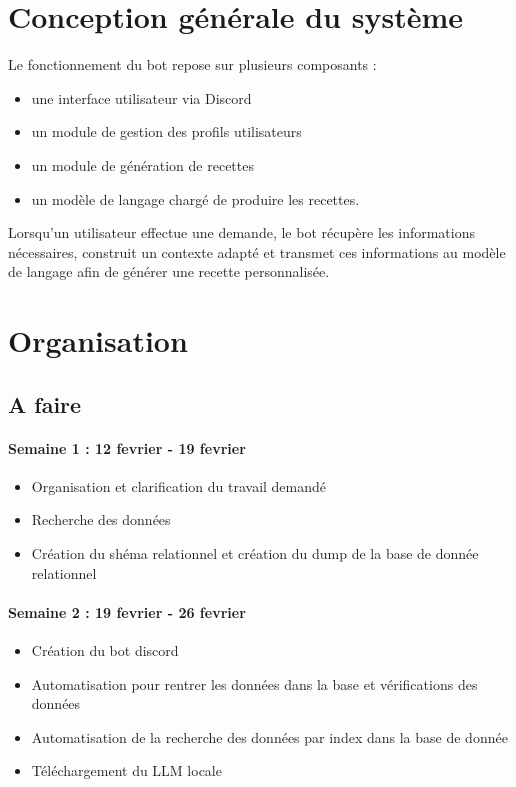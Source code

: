 \documentclass[12pt]{article}
\begin{document}
    \section{Conception générale du système}

        Le fonctionnement du bot repose sur plusieurs composants :
        \begin{itemize}
            \item une interface utilisateur via Discord 
            \item un module de gestion des profils utilisateurs 
            \item un module de génération de recettes 
            \item un modèle de langage chargé de produire les recettes.
        \end{itemize}

        Lorsqu’un utilisateur effectue une demande, le bot récupère les informations nécessaires, construit un contexte adapté et transmet ces informations au modèle de langage afin de générer une recette personnalisée.
    
    \section{Organisation} 
        \subsection{A faire} 
            \paragraph{Semaine 1 : 12 fevrier - 19 fevrier} 
                \begin{itemize} 
                    \item Organisation et clarification du travail demandé 
                    \item Recherche des données 
                    \item Création du shéma relationnel et création du dump de la base de donnée relationnel 
                \end{itemize} 
            \paragraph{Semaine 2 : 19 fevrier - 26 fevrier} 
                \begin{itemize} 
                    \item Création du bot discord 
                    \item Automatisation pour rentrer les données dans la base et vérifications des données 
                    \item Automatisation de la recherche des données par index dans la base de donnée 
                    \item Téléchargement du LLM locale 
                \end{itemize} 
\end{document}
